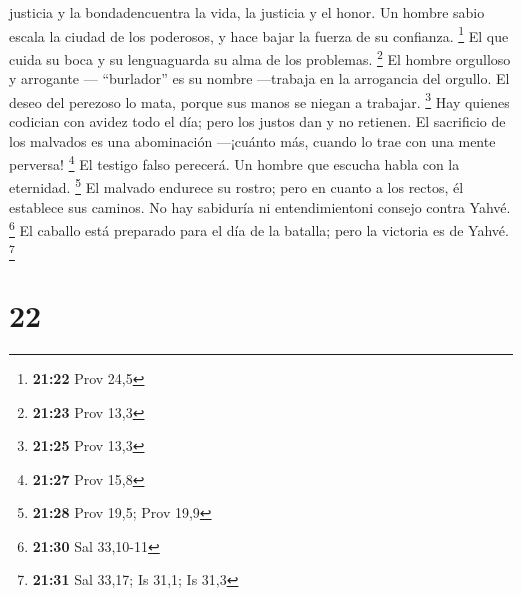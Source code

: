 justicia y la bondadencuentra la vida, la justicia y el honor.
 Un hombre sabio escala la ciudad de los poderosos, y
hace bajar la fuerza de su confianza. \footnote{\textbf{21:22} Prov 24,5}
 El que cuida su boca y su lenguaguarda su alma de los
problemas. \footnote{\textbf{21:23} Prov 13,3}  El hombre
orgulloso y arrogante --- ``burlador'' es su nombre ---trabaja en la
arrogancia del orgullo.  El deseo del perezoso lo mata,
porque sus manos se niegan a trabajar. \footnote{\textbf{21:25} Prov
  13,3}  Hay quienes codician con avidez todo el día;
pero los justos dan y no retienen.  El sacrificio de los
malvados es una abominación ---¡cuánto más, cuando lo trae con una mente
perversa! \footnote{\textbf{21:27} Prov 15,8}  El testigo
falso perecerá. Un hombre que escucha habla con la eternidad.
\footnote{\textbf{21:28} Prov 19,5; Prov 19,9}  El
malvado endurece su rostro; pero en cuanto a los rectos, él establece
sus caminos.  No hay sabiduría ni entendimientoni consejo
contra Yahvé. \footnote{\textbf{21:30} Sal 33,10-11}  El
caballo está preparado para el día de la batalla; pero la victoria es de
Yahvé. \footnote{\textbf{21:31} Sal 33,17; Is 31,1; Is 31,3}

\hypertarget{section-21}{%
\section{22}\label{section-21}}

